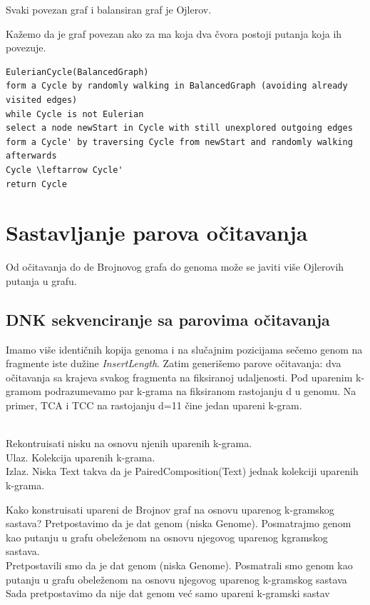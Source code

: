 \begin{teorema}
	Svaki povezan graf i balansiran graf je Ojlerov.
\end{teorema}

Kažemo da je graf povezan ako za ma koja dva čvora postoji putanja koja ih povezuje.



\begin{verbatim}
EulerianCycle(BalancedGraph)
form a Cycle by randomly walking in BalancedGraph (avoiding already visited edges)
while Cycle is not Eulerian
select a node newStart in Cycle with still unexplored outgoing edges
form a Cycle' by traversing Cycle from newStart and randomly walking afterwards
Cycle \leftarrow Cycle'
return Cycle
\end{verbatim}

\section{Sastavljanje parova očitavanja}

Od očitavanja do de Brojnovog grafa do genoma može se javiti više Ojlerovih putanja u grafu.

\subsection{DNK sekvenciranje sa parovima očitavanja} 

Imamo više identičnih kopija genoma i na slučajnim pozicijama sečemo genom na fragmente iste dužine \textit{InsertLength}. Zatim generišemo parove očitavanja: dva očitavanja sa krajeva svakog fragmenta na fiksiranoj udaljenosti.
Pod uparenim k-gramom podrazumevamo par k-grama na fiksiranom rastojanju d u genomu. Na primer, TCA i TCC na rastojanju d=11 čine jedan upareni k-gram.

\begin{problem} 
	~\\ Rekontruisati nisku na osnovu njenih uparenih k-grama.
	\\ Ulaz. Kolekcija uparenih k-grama.
	\\ Izlaz. Niska Text takva da je PairedComposition(Text) jednak kolekciji uparenih k-grama. 
\end{problem}

Kako konstruisati upareni de Brojnov graf na osnovu uparenog k-gramskog sastava?
Pretpostavimo da je dat genom (niska Genome). Posmatrajmo genom kao putanju u grafu obeleženom na osnovu njegovog uparenog kgramskog sastava.
\\
Pretpostavili smo da je dat genom (niska Genome). Posmatrali smo genom kao putanju u grafu obeleženom na osnovu njegovog uparenog k-gramskog sastava
\\
Sada pretpostavimo da nije dat genom već samo upareni k-gramski sastav

